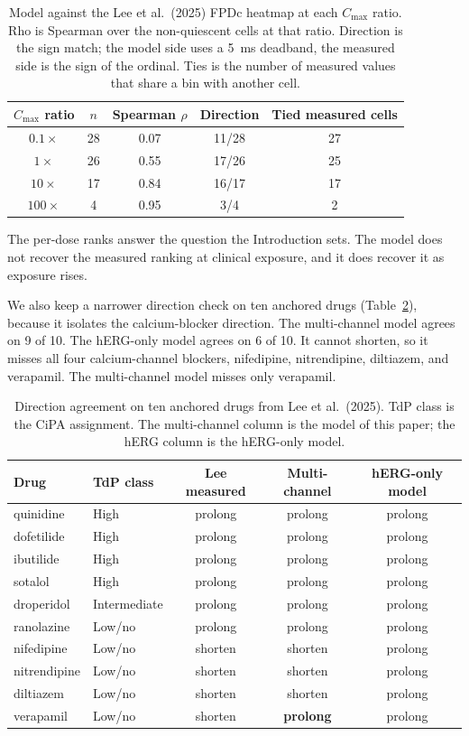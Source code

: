 \documentclass[preprint,12pt]{elsarticle}
\begin{document}
\begin{table}[!ht]
\centering
\caption{Model against the Lee et al.\ (2025) FPDc heatmap at each $C_{\mathrm{max}}$
ratio. Rho is Spearman over the non-quiescent cells at that ratio. Direction is the sign
match; the model side uses a 5~ms deadband, the measured side is the sign of the ordinal.
Ties is the number of measured values that share a bin with another cell.}
\label{tab:leedose}
\begin{tabular}{c c c c c}
\toprule
$C_{\mathrm{max}}$ ratio & $n$ & Spearman $\rho$ & Direction & Tied measured cells \\
\midrule
$0.1\times$ & 28 & 0.07 & 11/28 & 27 \\
$1\times$ & 26 & 0.55 & 17/26 & 25 \\
$10\times$ & 17 & 0.84 & 16/17 & 17 \\
$100\times$ & 4 & 0.95 & 3/4 & 2 \\
\bottomrule
\end{tabular}
\end{table}

The per-dose ranks answer the question the Introduction sets. The model does not recover
the measured ranking at clinical exposure, and it does recover it as exposure rises.

We also keep a narrower direction check on ten anchored drugs (Table~\ref{tab:lee}), because
it isolates the calcium-blocker direction. The multi-channel model agrees on 9 of 10. The
hERG-only model agrees on 6 of 10. It cannot shorten, so it misses all four
calcium-channel blockers, nifedipine, nitrendipine, diltiazem, and verapamil. The
multi-channel model misses only verapamil.

\begin{table}[!ht]
\centering
\caption{Direction agreement on ten anchored drugs from Lee et al.\ (2025). TdP class is
the CiPA assignment. The multi-channel column is the model of this paper; the hERG
column is the hERG-only model.}
\label{tab:lee}
\begin{tabular}{l l c c c}
\toprule
Drug & TdP class & Lee measured & Multi-channel & hERG-only model \\
\midrule
quinidine & High & prolong & prolong & prolong \\
dofetilide & High & prolong & prolong & prolong \\
ibutilide & High & prolong & prolong & prolong \\
sotalol & High & prolong & prolong & prolong \\
droperidol & Intermediate & prolong & prolong & prolong \\
ranolazine & Low/no & prolong & prolong & prolong \\
nifedipine & Low/no & shorten & shorten & prolong \\
nitrendipine & Low/no & shorten & shorten & prolong \\
diltiazem & Low/no & shorten & shorten & prolong \\
verapamil & Low/no & shorten & \textbf{prolong} & prolong \\
\bottomrule
\end{tabular}
\end{table}
\end{document}
